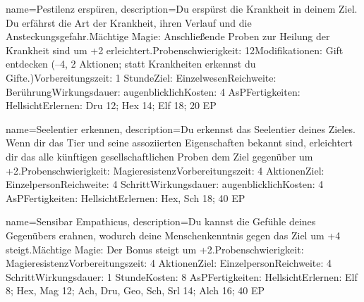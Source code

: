 {
    name={Pestilenz erspüren},
    description={Du erspürst die Krankheit in deinem Ziel. Du erfährst die Art der Krankheit, ihren Verlauf und die Ansteckungsgefahr.\newline Mächtige Magie: Anschließende Proben zur Heilung der Krankheit sind um +2 erleichtert.\newline Probenschwierigkeit: 12\newline Modifikationen: Gift entdecken (–4, 2 Aktionen; statt Krankheiten erkennst du Gifte.)\newline Vorbereitungszeit: 1 Stunde\newline Ziel: Einzelwesen\newline Reichweite: Berührung\newline Wirkungsdauer: augenblicklich\newline Kosten: 4 AsP\newline Fertigkeiten: Hellsicht\newline Erlernen: Dru 12; Hex 14; Elf 18; 20 EP}
}


{
    name={Seelentier erkennen},
    description={Du erkennst das Seelentier deines Zieles. Wenn dir das Tier und seine assoziierten Eigenschaften bekannt sind, erleichtert dir das alle künftigen gesellschaftlichen Proben dem Ziel gegenüber um +2.\newline Probenschwierigkeit: Magieresistenz\newline Vorbereitungszeit: 4 Aktionen\newline Ziel: Einzelperson\newline Reichweite: 4 Schritt\newline Wirkungsdauer: augenblicklich\newline Kosten: 4 AsP\newline Fertigkeiten: Hellsicht\newline Erlernen: Hex, Sch 18; 40 EP}
}


{
    name={Sensibar Empathicus},
    description={Du kannst die Gefühle deines Gegenübers erahnen, wodurch deine Menschenkenntnis gegen das Ziel um +4 steigt.\newline Mächtige Magie: Der Bonus steigt um +2.\newline Probenschwierigkeit: Magieresistenz\newline Vorbereitungszeit: 4 Aktionen\newline Ziel: Einzelperson\newline Reichweite: 4 Schritt\newline Wirkungsdauer: 1 Stunde\newline Kosten: 8 AsP\newline Fertigkeiten: Hellsicht\newline Erlernen: Elf 8; Hex, Mag 12; Ach, Dru, Geo, Sch, Srl 14; Alch 16; 40 EP}
}


